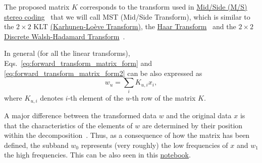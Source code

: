 The proposed matrix $K$ corresponds to the transform used in
\href{https://en.wikipedia.org/wiki/Joint_encoding#M/S_stereo_coding}{Mid/Side
  (M/S) stereo coding}~\cite{bosi2003intro} that we will call MST
(Mid/Side Transform), which is similar to the $2\times 2$ KLT
\href{http://fourier.eng.hmc.edu/e161/lectures/klt/node3.html}{(Karhunen-Lo\`eve
  Transform)}, the
\href{http://wavelets.pybytes.com/wavelet/haar/}{Haar
  Transform}~\cite{vetterli1995wavelets} and the $2\times 2$
\href{https://en.wikipedia.org/wiki/Hadamard_transform}{Discrete
  Walsh-Hadamard Transform}~\cite{sayood2017introduction}.

In general (for all the linear transforms),
Eqs.~\ref{eq:forward_transform_matrix_form} and
\ref{eq:forward_transform_matrix_form2} can be also expressed as
\begin{equation}
  w_u = \sum_i K_{u,i}x_i,
  \label{eq:forward_transform_linear_combination_form}
\end{equation}
where $K_{u,i}$ denotes $i$-th element of the $u$-th row of the matrix
$K$.

A major difference between the transformed data $w$ and the original
data $x$ is that the characteristics of the elements of $w$ are
determined by their position within the
decomposition~\cite{sayood2017introduction}. Thus, as a consequence of
how the matrix has been defined, the subband $w_0$ represents (very
roughly) the low frequencies of $x$ and $w_1$ the high
frequencies. This can be also seen in this
\href{https://github.com/Tecnologias-multimedia/intercom/blob/master/docs/stereo_transforms_RD.ipynb}{notebook}.

